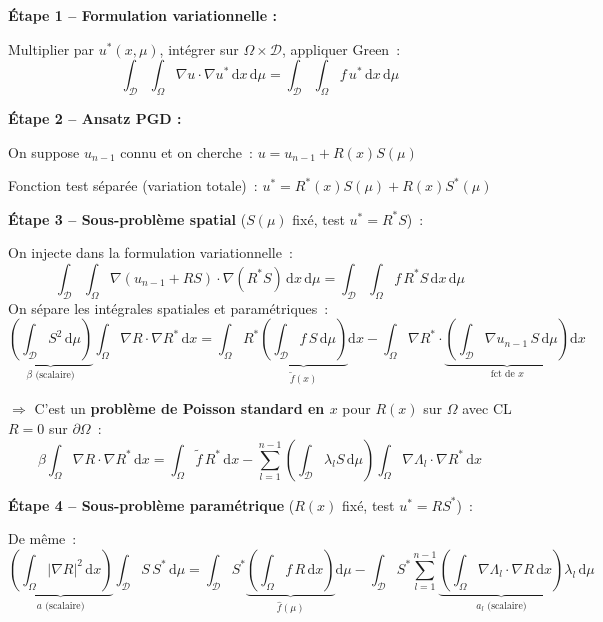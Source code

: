 \documentclass[11pt,a4paper]{article}
\begin{document}
\begin{formulabox}

\textbf{\'Etape 1 -- Formulation variationnelle :}

Multiplier par $u^*(x,\mu)$, int\'egrer sur $\Omega \times \mathcal{D}$, appliquer Green~:
\[
\boxed{\int_\mathcal{D}\int_\Omega \nabla u \cdot \nabla u^*\,\mathrm{d}x\,\mathrm{d}\mu = \int_\mathcal{D}\int_\Omega f\,u^*\,\mathrm{d}x\,\mathrm{d}\mu}
\]

\textbf{\'Etape 2 -- Ansatz PGD :}

On suppose $u_{n-1}$ connu et on cherche~: $u = u_{n-1} + R(x)S(\mu)$

Fonction test s\'epar\'ee (variation totale)~: $u^* = R^*(x)S(\mu) + R(x)S^*(\mu)$

\medskip
\textbf{\'Etape 3 -- Sous-probl\`eme spatial} ($S(\mu)$ fix\'e, test $u^* = R^*S$)~:

On injecte dans la formulation variationnelle~:
\[
\int_\mathcal{D}\int_\Omega \nabla(u_{n-1}+RS)\cdot\nabla(R^*S)\,\mathrm{d}x\,\mathrm{d}\mu = \int_\mathcal{D}\int_\Omega f\,R^*S\,\mathrm{d}x\,\mathrm{d}\mu
\]
On s\'epare les int\'egrales spatiales et param\'etriques~:
\[
\underbrace{\left(\int_\mathcal{D} S^2\,\mathrm{d}\mu\right)}_{\beta\text{ (scalaire)}} \int_\Omega \nabla R\cdot\nabla R^*\,\mathrm{d}x = \int_\Omega R^*\underbrace{\left(\int_\mathcal{D} f\,S\,\mathrm{d}\mu\right)}_{\tilde{f}(x)}\mathrm{d}x - \int_\Omega \nabla R^*\cdot\underbrace{\left(\int_\mathcal{D} \nabla u_{n-1}\,S\,\mathrm{d}\mu\right)}_{\text{fct de }x}\mathrm{d}x
\]

$\Rightarrow$ C'est un \textbf{probl\`eme de Poisson standard en $x$} pour $R(x)$ sur $\Omega$ avec CL $R=0$ sur $\partial\Omega$~:
\[
\boxed{\beta\int_\Omega \nabla R\cdot\nabla R^*\,\mathrm{d}x = \int_\Omega \tilde{f}\,R^*\,\mathrm{d}x - \sum_{l=1}^{n-1}\left(\int_\mathcal{D} \lambda_l S\,\mathrm{d}\mu\right)\int_\Omega\nabla\Lambda_l\cdot\nabla R^*\,\mathrm{d}x}
\]

\medskip
\textbf{\'Etape 4 -- Sous-probl\`eme param\'etrique} ($R(x)$ fix\'e, test $u^* = RS^*$)~:

De m\^eme~:
\[
\underbrace{\left(\int_\Omega |\nabla R|^2\,\mathrm{d}x\right)}_{a\text{ (scalaire)}} \int_\mathcal{D} S\,S^*\,\mathrm{d}\mu = \int_\mathcal{D} S^*\underbrace{\left(\int_\Omega f\,R\,\mathrm{d}x\right)}_{\hat{f}(\mu)}\mathrm{d}\mu - \int_\mathcal{D} S^*\sum_{l=1}^{n-1}\underbrace{\left(\int_\Omega\nabla\Lambda_l\cdot\nabla R\,\mathrm{d}x\right)}_{a_l\text{ (scalaire)}}\lambda_l\,\mathrm{d}\mu
\]


\end{formulabox}
\end{document}
